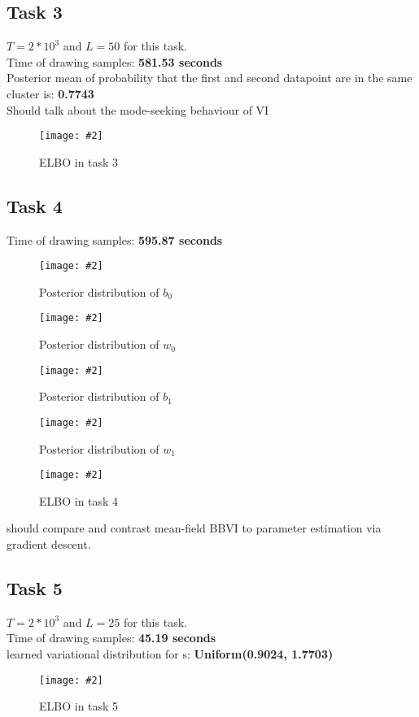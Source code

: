 \documentclass{article}
\def\red#1{{\color{red}#1}}
\newcommand{\centerfigcap}[3]{\begin{figure}[H]
\begin{center}\texttt{[image: \#2]} \caption{#3}\end{center}
\end{figure}}
\begin{document}
\subsection{Task 3}
$T = 2*10^3$ and $L = 50$ for this task.\\
Time of drawing samples: \textbf{581.53 seconds}\\
Posterior mean of probability that the first and second datapoint are in the same cluster is: \textbf{0.7743}\\
\red{Should talk about the mode-seeking behaviour of VI}
\centerfigcap{0.7}{../figures/ELBO_3}{ELBO in task 3}
\subsection{Task 4}
Time of drawing samples: \textbf{595.87 seconds}\\
\centerfigcap{0.6}{../figures/BBVI_plt_hitmap_program_4_b0}{Posterior distribution of $b_0$}
\centerfigcap{0.6}{../figures/BBVI_plt_hitmap_program_4_w0}{Posterior distribution of $w_0$}
\centerfigcap{0.6}{../figures/BBVI_plt_hitmap_program_4_b1}{Posterior distribution of $b_1$}
\centerfigcap{0.6}{../figures/BBVI_plt_hitmap_program_4_w1}{Posterior distribution of $w_1$}
\centerfigcap{1}{../figures/ELBO_4}{ELBO in task 4}
\red{should compare and contrast mean-field BBVI to parameter estimation via gradient descent.}


\subsection{Task 5}
$T = 2*10^3$ and $L = 25$ for this task.\\
Time of drawing samples: \textbf{45.19 seconds}\\
learned variational distribution for s: \textbf{Uniform(0.9024, 1.7703)} 
\centerfigcap{1}{../figures/ELBO_5}{ELBO in task 5}
\end{document}
